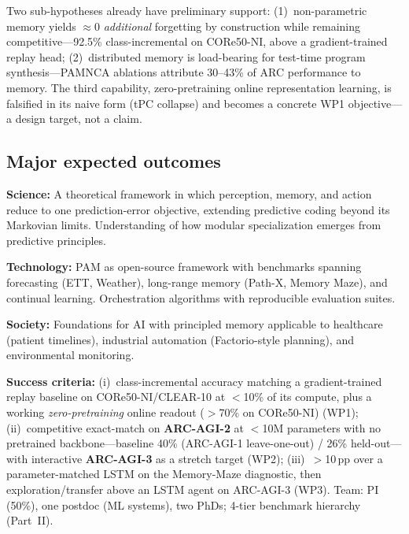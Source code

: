 Two sub-hypotheses already have preliminary support: (1)~non-parametric memory yields $\approx$0 \textit{additional} forgetting by construction while remaining competitive---92.5\% class-incremental on CORe50-NI, above a gradient-trained replay head; (2)~distributed memory is load-bearing for test-time program synthesis---PAMNCA ablations attribute 30--43\% of ARC performance to memory. The third capability, zero-pretraining online representation learning, is falsified in its naive form (tPC collapse) and becomes a concrete WP1 objective---a design target, not a claim.

\subsection{Major expected outcomes}

\noindent\textbf{Science:} A theoretical framework in which perception, memory, and action reduce to one prediction-error objective, extending predictive coding beyond its Markovian limits. Understanding of how modular specialization emerges from predictive principles.

\noindent\textbf{Technology:} PAM as open-source framework with benchmarks spanning forecasting (ETT, Weather), long-range memory (Path-X, Memory Maze), and continual learning. Orchestration algorithms with reproducible evaluation suites.

\noindent\textbf{Society:} Foundations for AI with principled memory applicable to healthcare (patient timelines), industrial automation (Factorio-style planning), and environmental monitoring.

\noindent\textbf{Success criteria:} (i)~class-incremental accuracy matching a gradient-trained replay baseline on CORe50-NI/CLEAR-10 at $<$10\% of its compute, plus a working \textit{zero-pretraining} online readout ($>$70\% on CORe50-NI) (WP1); (ii)~competitive exact-match on \textbf{ARC-AGI-2} at $<$10M parameters with no pretrained backbone---baseline 40\% (ARC-AGI-1 leave-one-out) / 26\% held-out---with interactive \textbf{ARC-AGI-3} as a stretch target (WP2); (iii)~$>$10\,pp over a parameter-matched LSTM on the Memory-Maze diagnostic, then exploration/transfer above an LSTM agent on ARC-AGI-3 (WP3). Team: PI (50\%), one postdoc (ML systems), two PhDs; 4-tier benchmark hierarchy (Part~II).

\printbibliography[title={References}]

